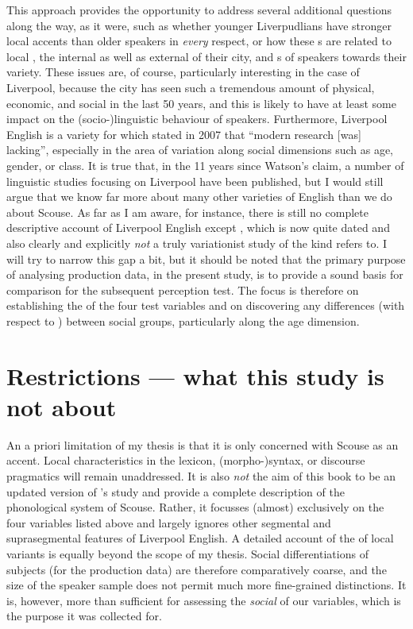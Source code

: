 This approach provides the opportunity to address several additional questions along the way, as it were, such as whether younger Liverpudlians have stronger local accents than older speakers in \emph{every} respect, or how these s are related to local , the internal as well as external  of their city, and s of speakers towards their variety.
These issues are, of course, particularly interesting in the case of Liverpool, because the city has seen such a tremendous amount of physical, economic, and social  in the last 50 years, and this is likely to have at least some impact on the (socio-)linguistic behaviour of speakers.
Furthermore, Liverpool English is a variety for which \textcite[351]{watson2007} stated in 2007 that ``modern research [was] lacking'', especially in the area of variation along social dimensions such as age, gender, or class.
It is true that, in the 11 years since Watson's claim, a number of linguistic studies focusing on Liverpool have been published, but I would still argue that we know far more about many other varieties of English than we do about Scouse.
As far as I am aware, for instance, there is still no complete descriptive account of Liverpool English except \cite{knowles1973}, which is now quite dated and also clearly and explicitly \emph{not} a truly variationist study of the kind \textcite{watson2007} refers to.
I will try to narrow this gap a bit, but it should be noted that the primary purpose of analysing production data, in the present study, is to provide a sound basis for comparison for the subsequent perception test.
The focus is therefore on establishing the  of the four test variables and on discovering any differences (with respect to ) between social groups, particularly along the age dimension.

\section{Restrictions --- what this study is not about}
\label{sec.intro.restrict}

An a priori limitation of my thesis is that it is only concerned with Scouse as an accent.
Local characteristics in the lexicon, (morpho-)syntax, or discourse pragmatics will remain unaddressed.
It is also \emph{not} the aim of this book to be an updated version of \citeauthor{knowles1973}'s \citeyear{knowles1973} study and provide a complete description of the phonological system of Scouse.
Rather, it focusses (almost) exclusively on the four variables listed above and largely ignores other segmental and suprasegmental features of Liverpool English.
A detailed account of the  of local variants is equally beyond the scope of my thesis.
Social differentiations of subjects (for the production data) are therefore comparatively coarse, and the size of the speaker sample does not permit much more fine-grained distinctions.
It is, however, more than sufficient for assessing the \emph{social } of our variables, which is the purpose it was collected for.

